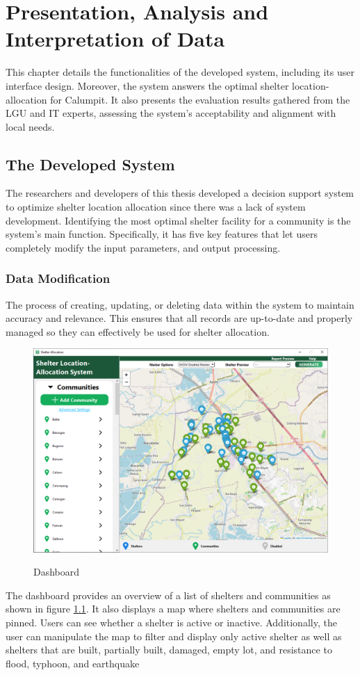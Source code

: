 \chapter{Presentation, Analysis and Interpretation of Data}
	This chapter details the functionalities of the developed system, including its user interface design. Moreover, the system answers the optimal shelter location-allocation for Calumpit. It also presents the evaluation results gathered from the LGU and IT experts, assessing the system’s acceptability and alignment with local needs.

\section{The Developed System}
	The researchers and developers of this thesis developed a decision support system to optimize shelter location allocation since there was a lack of system development. Identifying the most optimal shelter facility for a community is the system's main function. Specifically, it has five key features that let users completely modify the input parameters, and output processing. 


\subsection{Data Modification}
	The process of creating, updating, or deleting data within the system to maintain accuracy and relevance. This ensures that all records are up-to-date and properly managed so they can effectively be used for shelter allocation.
	
	\begin{figure}[h!]
		\caption{Dashboard}
		\centering
		\includegraphics[width=4.5in]{Chapter 4/dashboard}
		\label{db}
	\end{figure}
	The dashboard provides an overview of a list of shelters and communities as shown in figure \ref{db}. It also displays a map where shelters and communities are pinned. Users can see whether a shelter is active or inactive. Additionally, the user can manipulate the map to filter and display only active shelter as well as shelters that are built, partially built, damaged, empty lot, and resistance to flood, typhoon, and earthquake
	
